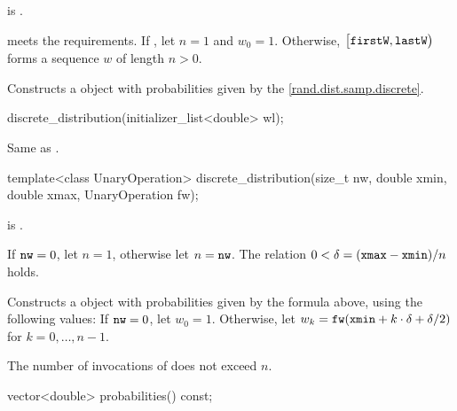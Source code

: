 \begin{itemdescr}
\pnum
\mandates
{} is .

\pnum
\expects
   meets the
   requirements.
 If ,
 let $n = 1$ and $w_0 = 1$.
 Otherwise,
 $\bigl[\tcode{firstW}, \tcode{lastW}\bigr)$
 forms a sequence $w$ of length $n > 0$.

\pnum
\effects
Constructs a  object
with probabilities given by the \eqref{rand.dist.samp.discrete}.
\end{itemdescr}


%
\begin{itemdecl}
discrete_distribution(initializer_list<double> wl);
\end{itemdecl}

\begin{itemdescr}
\pnum
\effects
 Same as .
\end{itemdescr}

\begin{itemdecl}
template<class UnaryOperation>
  discrete_distribution(size_t nw, double xmin, double xmax, UnaryOperation fw);
\end{itemdecl}

\begin{itemdescr}
\pnum
\mandates
{} is .

\pnum
\expects
 If $\tcode{nw} = 0$, let $n = 1$, otherwise let $n = \tcode{nw}$.
 The relation
   $0 < \delta = (\tcode{xmax} - \tcode{xmin}) / n$
 holds.

\pnum
\effects
Constructs a  object
 with probabilities given by the formula above,
 using the following values:
 If $\tcode{nw} = 0$,
 let $w_0 = 1$.
 Otherwise,
 let $w_k = \tcode{fw}(\tcode{xmin} + k \cdot \delta + \delta / 2)$
 for $k = 0, \dotsc, n - 1$.

\pnum
\complexity
The number of invocations of  does not exceed $n$.
\end{itemdescr}

%
\begin{itemdecl}
vector<double> probabilities() const;
\end{itemdecl}

